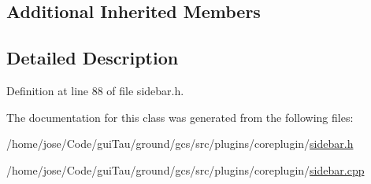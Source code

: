 \subsection*{Additional Inherited Members}


\subsection{Detailed Description}


Definition at line 88 of file sidebar.\-h.



The documentation for this class was generated from the following files\-:\begin{DoxyCompactItemize}
\item 
/home/jose/\-Code/gui\-Tau/ground/gcs/src/plugins/coreplugin/\hyperlink{sidebar_8h}{sidebar.\-h}\item 
/home/jose/\-Code/gui\-Tau/ground/gcs/src/plugins/coreplugin/\hyperlink{sidebar_8cpp}{sidebar.\-cpp}\end{DoxyCompactItemize}
